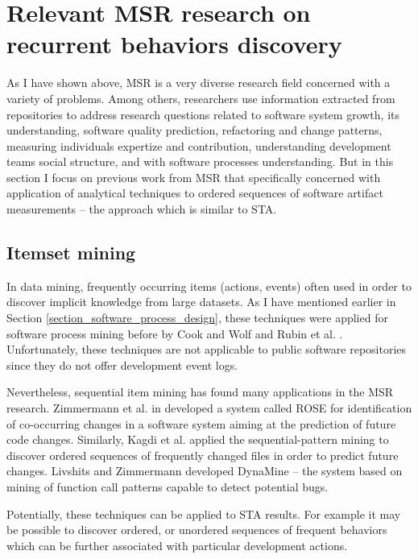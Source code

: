 \section{Relevant MSR research on recurrent behaviors discovery}
As I have shown above, MSR is a very diverse research field concerned with a variety of problems. 
Among others, researchers use information extracted from 
repositories to address research questions related to 
software system growth, 
its understanding,
software quality prediction,
refactoring and change patterns,
measuring individuals expertize and contribution,
understanding development teams social structure,
and with software processes understanding.
But in this section I focus on previous work from MSR that specifically concerned with application of analytical techniques 
to ordered sequences of software artifact measurements -- the approach which is similar to STA.

\subsection{Itemset mining}
In data mining, frequently occurring items (actions, events) often used in order to discover implicit knowledge from
large datasets. As I have mentioned earlier in Section \ref{section_software_process_design}, these techniques were 
applied for software process mining before by Cook and Wolf \cite{citeulike:328044} \cite{citeulike:5120757} 
\cite{citeulike:5128143} and Rubin et al. \cite{citeulike:1885717}. Unfortunately, these techniques are not applicable
to public software repositories since they do not offer development event logs.

Nevertheless, sequential item mining has found many applications in the MSR research.
Zimmermann et al. in \cite{citeulike:277045} developed a system called ROSE for identification of co-occurring changes 
in a software system aiming at the prediction of future code changes. 
Similarly, Kagdi et al. \cite{citeulike:3929070} applied the sequential-pattern mining to discover ordered sequences of 
frequently changed files in order to predict future changes. 
Livshits and Zimmermann \cite{citeulike:393158} developed DynaMine -- the system based on mining of function call 
patterns capable to detect potential bugs.

Potentially, these techniques can be applied to STA results. For example it may be possible to discover ordered, or
unordered sequences of frequent behaviors which can be further associated with particular development actions.

